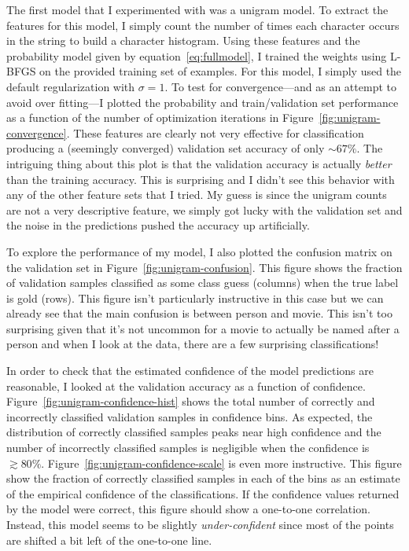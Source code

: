 \documentclass[11pt]{article}
\newcommand{\Fig}[1]{Figure~\ref{fig:#1}}
\newcommand{\fig}[1]{Figure~\ref{fig:#1}}
\newcommand{\code}[1]{{\sffamily #1}}
\begin{document}
The first model that I experimented with was a unigram model.
To extract the features for this model, I simply count the number of times
each character occurs in the string to build a character histogram.
Using these features and the probability model given by
equation~\ref{eq:fullmodel}, I trained the weights using \code{L-BFGS} on the
provided training set of examples.
For this model, I simply used the default regularization with $\sigma = 1$.
To test for convergence---and as an attempt to avoid over fitting---I plotted
the probability and train/validation set performance as a function of
the number of optimization iterations in \fig{unigram-convergence}.
These features are clearly not very effective for classification producing a
(seemingly converged) validation set accuracy of only $\sim67\%$.
The intriguing thing about this plot is that the validation accuracy is
actually \emph{better} than the training accuracy.
This is surprising and I didn't see this behavior with any of the other
feature sets that I tried.
My guess is since the unigram counts are not a very descriptive feature, we
simply got lucky with the validation set and the noise in the predictions
pushed the accuracy up artificially.

To explore the performance of my model, I also plotted the confusion matrix on
the validation set in \fig{unigram-confusion}.
This figure shows the fraction of validation samples classified as some class
\code{guess} (columns) when the true label is \code{gold} (rows).
This figure isn't particularly instructive in this case but we can already see
that the main confusion is between \code{person} and \code{movie}.
This isn't too surprising given that it's not uncommon for a movie to actually
be named after a person and when I look at the data, there are a few
surprising classifications!

In order to check that the estimated confidence of the model predictions are
reasonable, I looked at the validation accuracy as a function of confidence.
\Fig{unigram-confidence-hist} shows the total number of correctly and
incorrectly classified validation samples in confidence bins.
As expected, the distribution of correctly classified samples peaks near high
confidence and the number of incorrectly classified samples is negligible when
the confidence is $\gtrsim 80 \%$.
\Fig{unigram-confidence-scale} is even more instructive.
This figure show the fraction of correctly classified samples in each of the
bins as an estimate of the empirical confidence of the classifications.
If the confidence values returned by the model were correct, this figure
should show a one-to-one correlation.
Instead, this model seems to be slightly \emph{under-confident} since most of
the points are shifted a bit left of the one-to-one line.
\end{document}
